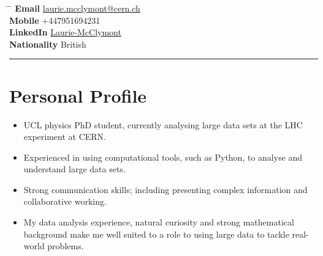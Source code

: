 \documentclass[10pt]{article} %
\begin{document}


\parbox{0.5\textwidth}{ %
\title{} %
}
\hspace{2cm} %
\parbox{0.5\textwidth}{ %
  \begin{tabbing} %
    \hspace{2.3cm} \= \hspace{3cm} \= \kill %
           {\bf Email} \> \href{mailto:laurie.mcclymont@cern.ch}{laurie.mcclymont@cern.ch} \\ %
           {\bf Mobile} \> +447951694231  \\ %
           {\bf LinkedIn} \> \href{https://www.linkedin.com/in/laurie-mcclymont-695520118/}{Laurie-McClymont} \\ %
           {\bf Nationality} \> British
  \end{tabbing}
}

\rule{\textwidth}{0.5mm}


\vspace{-2mm}
\section{Personal Profile}
\begin{itemize}
\item{UCL physics PhD student, currently analysing large data sets at the LHC experiment at CERN.}
\item{Experienced in using computational tools, such as Python, to analyse and understand large data sets.}
\item{Strong communication skills; including presenting complex information and collaborative working.}
\item{My data analysis experience, natural curiosity and strong mathematical background make me well suited to a role to using large data to tackle real-world problems.}
\end{itemize}
\end{document}
